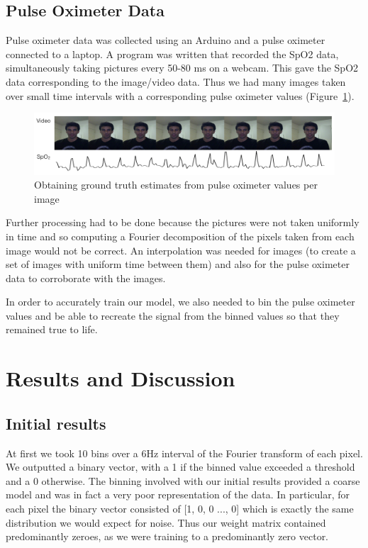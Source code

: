 \documentclass[12pt]{article}
\begin{document}
\subsection*{Pulse Oximeter Data}
  Pulse oximeter data was collected using an Arduino and a pulse oximeter connected to a laptop. 
  A program was written that recorded the SpO2 data, simultaneously taking pictures every 50-80 ms on a webcam.
  This gave the SpO2 data corresponding to the image/video data.
  Thus we had many images taken over small time intervals with a corresponding pulse oximeter values (Figure~\ref{figure:images_and_pulseox}).

  \begin{figure}
    \captionsetup{justification=centering}
    \includegraphics[width=\textwidth]{images/fig3.png}
    \caption{Obtaining ground truth estimates from pulse oximeter values per image \label{figure:images_and_pulseox}}
  \end{figure}

  Further processing had to be done because the pictures were not taken uniformly in time and so computing a Fourier decomposition of the pixels taken from each image would not be correct.
  An interpolation was needed for images (to create a set of images with uniform time between them) and also for the pulse oximeter data to corroborate with the images.

  In order to accurately train our model, we also needed to bin the pulse oximeter values and be able to recreate the signal from the binned values so that they remained true to life.
  
  


\section{Results and Discussion}
 \subsection*{Initial results}
  At first we took 10 bins over a 6Hz interval of the Fourier transform of each pixel. We outputted a binary vector, with a 1 if the binned value exceeded a threshold and a 0 otherwise. The binning involved with our initial results provided a coarse model and was in fact a very poor representation of the data. In particular, for each pixel the binary vector consisted of [1, 0, 0 ..., 0] which is exactly the same distribution we would expect for noise. Thus our weight matrix contained predominantly zeroes, as we were training to a predominantly zero vector.
\end{document}
